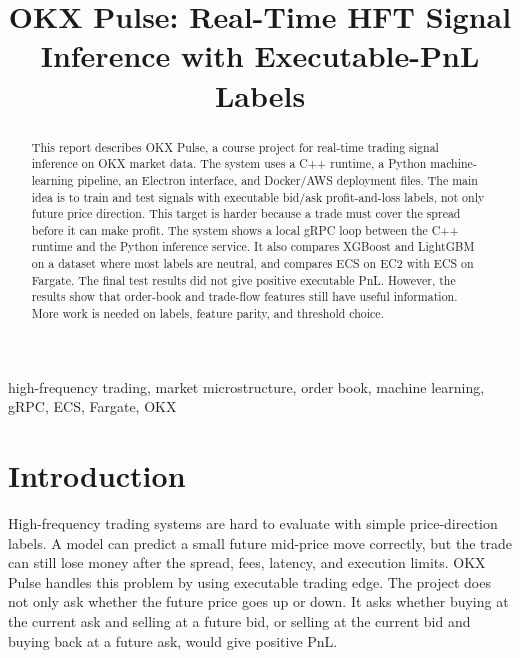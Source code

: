 \documentclass[conference]{../IEEEtran/IEEEtran}
\begin{document}
\title{OKX Pulse: Real-Time HFT Signal Inference with Executable-PnL Labels}

\author{
}

\maketitle
\raggedbottom

\begin{abstract}
    This report describes OKX Pulse, a course project for real-time trading signal inference on OKX market data. The system uses a C++ runtime, a Python machine-learning pipeline, an Electron interface, and Docker/AWS deployment files. The main idea is to train and test signals with executable bid/ask profit-and-loss labels, not only future price direction. This target is harder because a trade must cover the spread before it can make profit. The system shows a local gRPC loop between the C++ runtime and the Python inference service. It also compares XGBoost and LightGBM on a dataset where most labels are neutral, and compares ECS on EC2 with ECS on Fargate. The final test results did not give positive executable PnL. However, the results show that order-book and trade-flow features still have useful information. More work is needed on labels, feature parity, and threshold choice.
\end{abstract}

\begin{IEEEkeywords}
    high-frequency trading, market microstructure, order book, machine learning, gRPC, ECS, Fargate, OKX
\end{IEEEkeywords}

\section{Introduction}

High-frequency trading systems are hard to evaluate with simple price-direction labels. A model can predict a small future mid-price move correctly, but the trade can still lose money after the spread, fees, latency, and execution limits. OKX Pulse handles this problem by using executable trading edge. The project does not only ask whether the future price goes up or down. It asks whether buying at the current ask and selling at a future bid, or selling at the current bid and buying back at a future ask, would give positive PnL.
\end{document}
